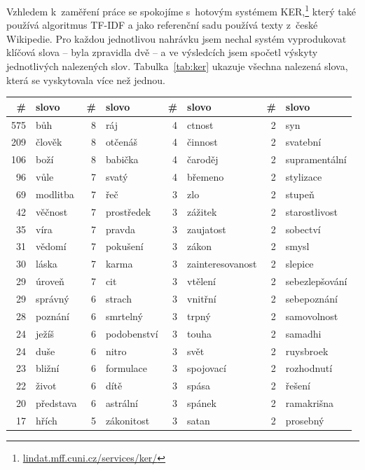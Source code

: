Vzhledem k~zaměření práce se spokojíme s~hotovým systémem
KER,\footnote{\href{http://lindat.mff.cuni.cz/services/ker/}{lindat.mff.cuni.cz/services/ker/}} který také používá
algoritmus TF-IDF a jako referenční sadu používá texty z~české Wikipedie.
Pro každou jednotlivou nahrávku jsem nechal systém vyprodukovat klíčová slova --
byla zpravidla dvě -- a ve výsledcích jsem spočetl výskyty jednotlivých
nalezených slov.
Tabulka~\ref{tab:ker} ukazuje všechna nalezená slova, která se vyskytovala více
než jednou.

\begin{table}[htpb]
\begin{center}
\begin{tabular}{|r l|r l|r l|r l|}
\hline
\# & slovo & \# & slovo & \# & slovo & \# & slovo \\
\hline
575 & bůh	 & 8 & ráj	 & 4 & ctnost	 & 2 & syn	 \\
209 & člověk	 & 8 & otčenáš	 & 4 & činnost	 & 2 & svatební	 \\
106 & boží	 & 8 & babička	 & 4 & čaroděj	 & 2 & supramentální	 \\
96 & vůle	 & 7 & svatý	 & 4 & břemeno	 & 2 & stylizace	 \\
69 & modlitba	 & 7 & řeč	 & 3 & zlo	 & 2 & stupeň	 \\
42 & věčnost	 & 7 & prostředek	 & 3 & zážitek	 & 2 & starostlivost	 \\
35 & víra	 & 7 & pravda	 & 3 & zaujatost	 & 2 & sobectví	 \\
31 & vědomí	 & 7 & pokušení	 & 3 & zákon	 & 2 & smysl	 \\
30 & láska	 & 7 & karma	 & 3 & zainteresovanost & 2 & slepice	 \\
29 & úroveň	 & 7 & cit	 & 3 & vtělení	 & 2 & sebezlepšování	 \\
29 & správný	 & 6 & strach	 & 3 & vnitřní	 & 2 & sebepoznání	 \\
28 & poznání	 & 6 & smrtelný	 & 3 & trpný	 & 2 & samovolnost	 \\
24 & ježíš	 & 6 & podobenství	 & 3 & touha	 & 2 & samadhi	 \\
24 & duše	 & 6 & nitro	 & 3 & svět	 & 2 & ruysbroek	 \\
23 & bližní	 & 6 & formulace	 & 3 & spojovací	 & 2 & rozhodnutí	 \\
22 & život	 & 6 & dítě	 & 3 & spása	 & 2 & řešení	 \\
20 & představa	 & 6 & astrální	 & 3 & spánek	 & 2 & ramakrišna	 \\
17 & hřích	 & 5 & zákonitost	 & 3 & satan	 & 2 & prosebný	 \\

\end{tabular}
\end{center}
\end{table}
